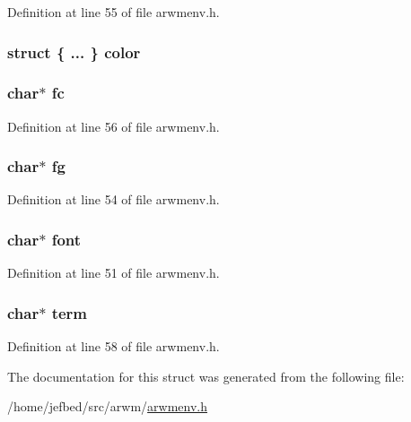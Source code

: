 Definition at line 55 of file arwmenv.h.

\hypertarget{struct_global_options_ae2532ccb54b0db81d8963878a3cc6ccd}{
\subsubsection[{color}]{\setlength{\rightskip}{0pt plus 5cm}struct \{ ... \}   {\bf color}}}
\label{struct_global_options_ae2532ccb54b0db81d8963878a3cc6ccd}
\hypertarget{struct_global_options_ab2c40bfed8329f7e610b145353eb7c64}{
\subsubsection[{fc}]{\setlength{\rightskip}{0pt plus 5cm}char$\ast$ {\bf fc}}}
\label{struct_global_options_ab2c40bfed8329f7e610b145353eb7c64}


Definition at line 56 of file arwmenv.h.

\hypertarget{struct_global_options_ad56beabb2008e5f5764b1d5f3cb95f99}{
\subsubsection[{fg}]{\setlength{\rightskip}{0pt plus 5cm}char$\ast$ {\bf fg}}}
\label{struct_global_options_ad56beabb2008e5f5764b1d5f3cb95f99}


Definition at line 54 of file arwmenv.h.

\hypertarget{struct_global_options_a2ccdf0b1af9425d3da05630f4ad83e55}{
\subsubsection[{font}]{\setlength{\rightskip}{0pt plus 5cm}char$\ast$ {\bf font}}}
\label{struct_global_options_a2ccdf0b1af9425d3da05630f4ad83e55}


Definition at line 51 of file arwmenv.h.

\hypertarget{struct_global_options_a7a0d03e64272a3c3e49e50d0b00f9f64}{
\subsubsection[{term}]{\setlength{\rightskip}{0pt plus 5cm}char$\ast$ {\bf term}}}
\label{struct_global_options_a7a0d03e64272a3c3e49e50d0b00f9f64}


Definition at line 58 of file arwmenv.h.



The documentation for this struct was generated from the following file:\begin{DoxyCompactItemize}
\item 
/home/jefbed/src/arwm/\hyperlink{arwmenv_8h}{arwmenv.h}\end{DoxyCompactItemize}
